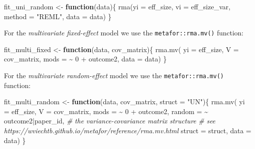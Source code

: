 \documentclass[
]{article}
\newenvironment{Shaded}{\begin{snugshade}}{\end{snugshade}}
\newcommand{\AttributeTok}[1]{\textcolor[rgb]{0.77,0.63,0.00}{#1}}
\newcommand{\CommentTok}[1]{\textcolor[rgb]{0.56,0.35,0.01}{\textit{#1}}}
\newcommand{\ControlFlowTok}[1]{\textcolor[rgb]{0.13,0.29,0.53}{\textbf{#1}}}
\newcommand{\DecValTok}[1]{\textcolor[rgb]{0.00,0.00,0.81}{#1}}
\newcommand{\FunctionTok}[1]{\textcolor[rgb]{0.00,0.00,0.00}{#1}}
\newcommand{\NormalTok}[1]{#1}
\newcommand{\OtherTok}[1]{\textcolor[rgb]{0.56,0.35,0.01}{#1}}
\newcommand{\SpecialCharTok}[1]{\textcolor[rgb]{0.00,0.00,0.00}{#1}}
\newcommand{\StringTok}[1]{\textcolor[rgb]{0.31,0.60,0.02}{#1}}
\begin{document}
\begin{Shaded}
\begin{Highlighting}[]
\NormalTok{fit\_uni\_random }\OtherTok{\textless{}{-}} \ControlFlowTok{function}\NormalTok{(data)\{}
    \FunctionTok{rma}\NormalTok{(}\AttributeTok{yi =}\NormalTok{ eff\_size, }
        \AttributeTok{vi =}\NormalTok{ eff\_size\_var,}
        \AttributeTok{method =} \StringTok{"REML"}\NormalTok{,}
        \AttributeTok{data =}\NormalTok{ data)}
\NormalTok{\}}
\end{Highlighting}
\end{Shaded}

For the \emph{multivariate fixed-effect} model we use the \texttt{metafor::rma.mv()} function:

\begin{Shaded}
\begin{Highlighting}[]
\NormalTok{fit\_multi\_fixed }\OtherTok{\textless{}{-}} \ControlFlowTok{function}\NormalTok{(data, cov\_matrix)\{}
    \FunctionTok{rma.mv}\NormalTok{(}
        \AttributeTok{yi =}\NormalTok{ eff\_size,}
        \AttributeTok{V =}\NormalTok{ cov\_matrix,}
        \AttributeTok{mods =} \SpecialCharTok{\textasciitilde{}} \DecValTok{0} \SpecialCharTok{+}\NormalTok{ outcome2,}
        \AttributeTok{data =}\NormalTok{ data)}
\NormalTok{\}}
\end{Highlighting}
\end{Shaded}

For the \emph{multivariate random-effect} model we use the \texttt{metafor::rma.mv()} function:

\begin{Shaded}
\begin{Highlighting}[]
\NormalTok{fit\_multi\_random }\OtherTok{\textless{}{-}} \ControlFlowTok{function}\NormalTok{(data, cov\_matrix, }\AttributeTok{struct =} \StringTok{"UN"}\NormalTok{)\{}
    \FunctionTok{rma.mv}\NormalTok{(}
        \AttributeTok{yi =}\NormalTok{ eff\_size,}
        \AttributeTok{V =}\NormalTok{ cov\_matrix,}
        \AttributeTok{mods =} \SpecialCharTok{\textasciitilde{}} \DecValTok{0} \SpecialCharTok{+}\NormalTok{ outcome2,}
        \AttributeTok{random =} \SpecialCharTok{\textasciitilde{}}\NormalTok{ outcome2}\SpecialCharTok{|}\NormalTok{paper\_id,}
        \CommentTok{\# the variance{-}covariance matrix structure }
        \CommentTok{\# see https://wviechtb.github.io/metafor/reference/rma.mv.html}
        \AttributeTok{struct =}\NormalTok{ struct,}
        \AttributeTok{data =}\NormalTok{ data)}
\NormalTok{\}}
\end{Highlighting}
\end{Shaded}
\end{document}
